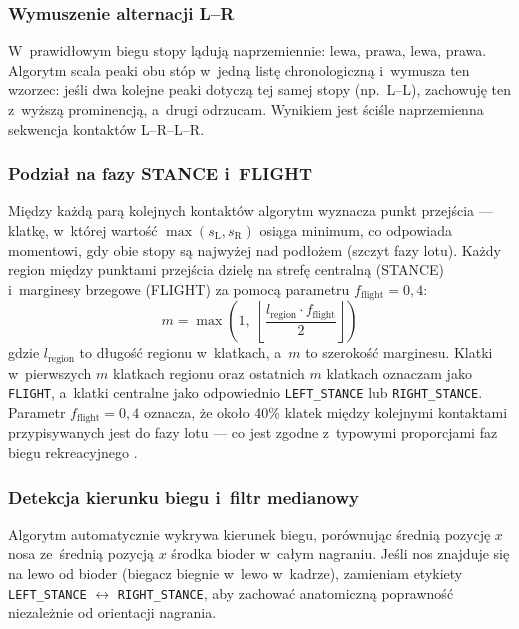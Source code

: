\subsubsection{Wymuszenie alternacji L--R}

W~prawidłowym biegu stopy lądują naprzemiennie: lewa, prawa, lewa, prawa. Algorytm scala peaki obu stóp w~jedną listę chronologiczną i~wymusza ten wzorzec: jeśli dwa kolejne peaki dotyczą tej samej stopy (np.~L--L), zachowuję ten z~wyższą prominencją, a~drugi odrzucam. Wynikiem jest ściśle naprzemienna sekwencja kontaktów L--R--L--R.

\subsubsection{Podział na fazy STANCE i~FLIGHT}

Między każdą parą kolejnych kontaktów algorytm wyznacza punkt przejścia --- klatkę, w~której wartość $\max(s_{\text{L}}, s_{\text{R}})$ osiąga minimum, co odpowiada momentowi, gdy obie stopy są najwyżej nad podłożem (szczyt fazy lotu). Każdy region między punktami przejścia dzielę na strefę centralną (STANCE) i~marginesy brzegowe (FLIGHT) za pomocą parametru $f_{\text{flight}} = 0{,}4$:
\[
m = \max\!\left(1,\;\left\lfloor \frac{l_{\text{region}} \cdot f_{\text{flight}}}{2} \right\rfloor\right)
\]
gdzie $l_{\text{region}}$ to długość regionu w~klatkach, a~$m$ to szerokość marginesu. Klatki w~pierwszych $m$ klatkach regionu oraz ostatnich $m$ klatkach oznaczam jako \texttt{FLIGHT}, a~klatki centralne jako odpowiednio \texttt{LEFT\_STANCE} lub \texttt{RIGHT\_STANCE}. \\Parametr $f_{\text{flight}} = 0{,}4$ oznacza, że około 40\% klatek między kolejnymi kontaktami przypisywanych jest do fazy lotu --- co jest zgodne z~typowymi proporcjami faz biegu rekreacyjnego \cite{novacheck1998}.

\subsubsection{Detekcja kierunku biegu i~filtr medianowy}

Algorytm automatycznie wykrywa kierunek biegu, porównując średnią pozycję $x$ nosa ze~średnią pozycją $x$ środka bioder w~całym nagraniu. Jeśli nos znajduje się na lewo od bioder (biegacz biegnie w~lewo w~kadrze), zamieniam etykiety \texttt{LEFT\_STANCE} $\leftrightarrow$ \texttt{RIGHT\_STANCE}, aby zachować anatomiczną poprawność niezależnie od orientacji nagrania.

